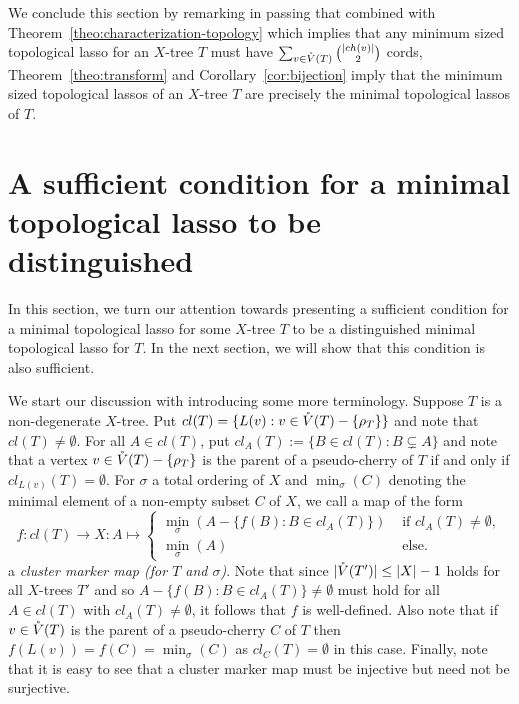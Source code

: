 We conclude this section by remarking in passing that 
combined with Theorem~\ref{theo:characterization-topology} 
which implies that any minimum sized topological lasso for an $X$-tree
$T$ must have $\sum_{v\in \mathring{V}(T)}{|ch(v)|\choose 2}$ cords, 
Theorem~\ref{theo:transform} and Corollary~\ref{cor:bijection}
imply that the minimum sized topological lassos of an $X$-tree $T$
are precisely the minimal topological lassos of $T$.
 
\section{A sufficient condition for a minimal topological lasso
to be distinguished} \label{sec:sufficient}
In this section, we turn our attention towards
presenting a sufficient condition
for a minimal topological lasso for some $X$-tree $T$ to
be a distinguished minimal topological lasso for $T$.
In the next section, we will show that this condition is also 
sufficient.  

We start our discussion with introducing some more terminology.
Suppose $T$ is a non-degenerate $X$-tree. Put 
$cl(T)=\{L(v): v\in \mathring{V}(T)-\{\rho_T\}\}$ and note that 
$cl(T)\not=\emptyset$. For all $A\in cl(T)$,
put $cl_A(T):=\{B\in cl(T): B\subsetneq A\}$ and note that
a vertex $v\in \mathring{V}(T)-\{\rho_T\}$ is the parent of a pseudo-cherry
of $T$ if and only if $cl_{L(v)}(T)=\emptyset$.
For $\sigma$ 
a total ordering of $X$ and $\min_{\sigma}(C)$ denoting the minimal
element of a non-empty subset $C$ of $X$, we call
a map of the form 
$$
f:cl(T)\to X:
A\mapsto \left\{\begin{array}{cc}
\min_{\sigma}(A-\{f(B): B\in cl_A(T)\})
 & \mbox{ if }cl_A(T)\not=\emptyset,\\
\min_{\sigma}(A)  & \mbox{ else. }
\end{array}
\right.
$$ 
a {\em cluster marker map (for $T$ and $\sigma$)}. 
Note that since $|\mathring{V}(T')|\leq |X|-1$ holds for all $X$-trees $T'$
and so $A-\{f(B): B\in cl_A(T)\}\not=\emptyset$  must
hold for all $A\in cl(T)$ with $cl_A(T)\not=\emptyset $,
it follows that  $f$ is well-defined.
Also note that if 
$v\in \mathring{V}(T)$ is the parent of a pseudo-cherry $C$ of $T$
then $f(L(v))=f(C)= \min_{\sigma}(C)$
as $cl_C(T)=\emptyset$ in this case. Finally, note that
it is easy to see that a cluster marker map must be injective
but need not be surjective.


